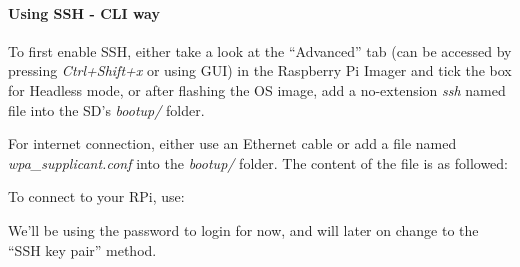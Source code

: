 \begin{Shaded}
\begin{Highlighting}[]
\ExtensionTok{$}
\end{Highlighting}
\end{Shaded}

\hypertarget{using-ssh---cli-way}{%
\paragraph{Using SSH - CLI way}\label{using-ssh---cli-way}}

To first enable SSH, either take a look at the ``Advanced'' tab (can be
accessed by pressing \emph{Ctrl+Shift+x} or using GUI) in the Raspberry
Pi Imager and tick the box for Headless mode, or after flashing the OS
image, add a no-extension \emph{ssh} named file into the SD's
\emph{bootup/} folder.

For internet connection, either use an Ethernet cable or add a file
named \emph{wpa\_supplicant.conf} into the \emph{bootup/} folder. The
content of the file is as followed:

\begin{Shaded}
\begin{Highlighting}[]
\OperatorTok{=}
\NormalTok{ = \{}
    \NormalTok{ = }
    \NormalTok{ = }
\ErrorTok{\}}
\end{Highlighting}
\end{Shaded}

To connect to your RPi, use:

\begin{Shaded}
\begin{Highlighting}[]
\ExtensionTok{$}\OperatorTok{\textless{}}\OperatorTok{\textgreater{}}
\end{Highlighting}
\end{Shaded}

We'll be using the password to login for now, and will later on change
to the ``SSH key pair'' method.

